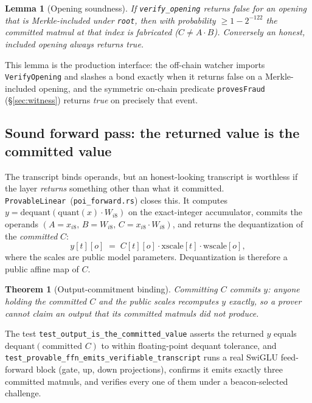 \documentclass[11pt,a4paper]{article}
\newtheorem{theorem}{Theorem}
\newtheorem{lemma}{Lemma}
\begin{document}
\begin{lemma}[Opening soundness]\label{lem:opening}
If \texttt{verify\_opening} returns false for an opening that is Merkle-included under \texttt{root}, then with probability $\ge 1 - 2^{-122}$ the committed matmul at that index is fabricated ($C \neq A\cdot B$). Conversely an honest, included opening always returns true.
\end{lemma}

This lemma is the production interface: the off-chain watcher imports \texttt{VerifyOpening} and slashes a bond exactly when it returns false on a Merkle-included opening, and the symmetric on-chain predicate \texttt{provesFraud} (\S\ref{sec:witness}) returns \emph{true} on precisely that event.

\subsection{Sound forward pass: the returned value is the committed value}\label{sec:forward}

The transcript binds operands, but an honest-looking transcript is worthless if the layer \emph{returns} something other than what it committed. \texttt{ProvableLinear}~(\texttt{poi\_forward.rs}) closes this. It computes $y = \mathrm{dequant}(\mathrm{quant}(x) \cdot W_{i8})$ on the exact-integer accumulator, commits the operands $(A = x_{i8},\, B = W_{i8},\, C = x_{i8}\!\cdot\!W_{i8})$, and returns the dequantization of the \emph{committed} $C$:
\[
  y[t][o] \;=\; C[t][o] \cdot \text{xscale}[t] \cdot \text{wscale}[o],
\]
where the scales are public model parameters. Dequantization is therefore a public affine map of $C$.

\begin{theorem}[Output-commitment binding]\label{thm:output}
Committing $C$ commits $y$: anyone holding the committed $C$ and the public scales recomputes $y$ exactly, so a prover cannot claim an output that its committed matmuls did not produce.
\end{theorem}

The test \texttt{test\_output\_is\_the\_committed\_value} asserts the returned $y$ equals $\mathrm{dequant}(\text{committed } C)$ to within floating-point dequant tolerance, and \texttt{test\_provable\_ffn\_emits\_verifiable\_transcript} runs a real SwiGLU feed-forward block (gate, up, down projections), confirms it emits exactly three committed matmuls, and verifies every one of them under a beacon-selected challenge.
\end{document}
